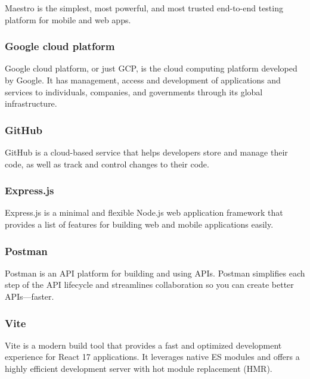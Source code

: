 Maestro \cite{MaestroDocs2022} is the simplest, most powerful, and most trusted end-to-end testing platform for mobile and web apps.

\subsubsection*{\protect{} Google cloud platform}

Google cloud platform, or just GCP, is the cloud computing platform developed by Google. It has management, access and development of applications and services to individuals, companies, and governments through its global infrastructure.

\subsubsection*{\protect{} GitHub}

GitHub \cite{GithubWebsite} is a cloud-based service that helps developers store and manage their code, as well as track and control changes to their code.

\subsubsection*{\protect{} Express.js}

Express.js \cite{ExpressJSWebsite} is a minimal and flexible Node.js \cite{NodeJSWebsite} web application framework that provides a list of features for building web and mobile applications easily.

\subsubsection*{\protect{} Postman}

Postman \cite{PostmanWebsite} is an API platform for building and using APIs. Postman simplifies each step of the API lifecycle and streamlines collaboration so you can create better APIs—faster.

\subsubsection*{\protect{} Vite}

Vite \cite{ViteJSWebsite} is a modern build tool that provides a fast and optimized development experience for React 17 applications. It leverages native ES modules and offers a highly efficient development server with hot module replacement (HMR).

